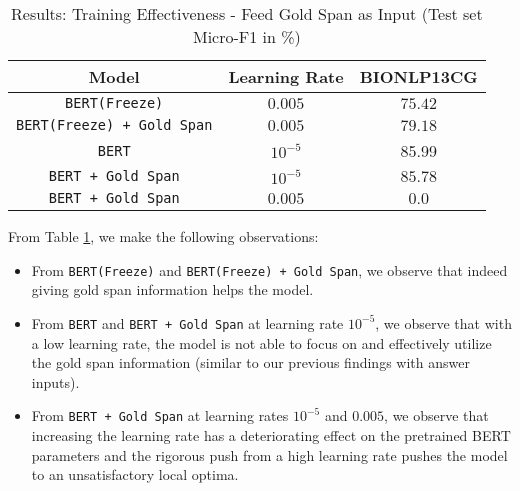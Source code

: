 \begin{table}[h!]
\centering
\begin{tabular}{|c|c|c|}\hline
	\textbf{Model} & \textbf{Learning Rate} & \textbf{BIONLP13CG}\\\hline
	\texttt{BERT(Freeze)} & $0.005$ & $75.42$\\\hline
	\texttt{BERT(Freeze) + Gold Span} & $0.005$ & $79.18$\\\hline
	\texttt{BERT} & $10^{-5}$ & 85.99\\\hline
	\texttt{BERT + Gold Span} & $10^{-5}$ & $85.78$\\\hline
	\texttt{BERT + Gold Span} & $0.005$ & $0.0$\\\hline
	\end{tabular}
    \caption{Results: Training Effectiveness - Feed Gold Span as Input (Test set Micro-F1 in \%)}
    \label{tab:res_training_span_input}
\end{table}

From Table \ref{tab:res_training_span_input}, we make the following observations:

\begin{itemize}
    \item From \texttt{BERT(Freeze)} and \texttt{BERT(Freeze) + Gold Span}, we observe that indeed giving gold span information helps the model.
    
    
    \item From \texttt{BERT} and \texttt{BERT + Gold Span} at learning rate $10^{-5}$, we observe that with a low learning rate, the model is not able to focus on and effectively utilize the gold span information (similar to our previous findings with answer inputs).
    
    \item From \texttt{BERT + Gold Span} at learning rates $10^{-5}$ and $0.005$, we observe that increasing the learning rate has a deteriorating effect on the pretrained BERT parameters and the rigorous push from a high learning rate pushes the model to an unsatisfactory local optima.
\end{itemize}


